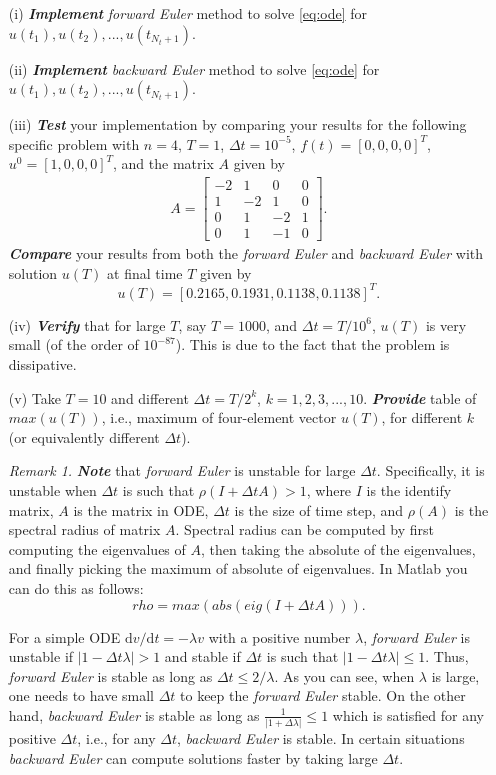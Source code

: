 \documentclass[11pt,a4paper]{article}
\newcommand{\dd}{\mathrm{d}}
\newcommand{\bfit}[1]{\textit{\textbf{#1}}}
\newcommand{\bmatx}[1]{\begin{bmatrix}
    #1
\end{bmatrix}}
\begin{document}
\begin{itemize}
\item[(i)] \bfit{Implement} {\it forward Euler} method to solve \eqref{eq:ode} for $u(t_1), u(t_2), ..., u(t_{N_t + 1})$.
\item[(ii)] \bfit{Implement} {\it backward Euler} method to solve \eqref{eq:ode} for $u(t_1), u(t_2), ..., u(t_{N_t + 1})$.
\item[(iii)] \bfit{Test} your implementation by comparing your results for the following specific problem with $n=4$, $T = 1$, $\Delta t = 10^{-5}$, $f(t) = [0, 0, 0, 0]^T$, $u^0 = [1, 0, 0, 0]^T$, and the matrix $A$ given by
\begin{align}
A = \bmatx{-2 & 1 & 0 & 0 \\ 1 & -2 & 1 & 0 \\ 0 & 1 & -2 & 1 \\ 0 & 1 & -1 & 0 }.
\end{align}
\bfit{Compare} your results from both the {\it forward Euler} and {\it backward Euler} with solution $u(T)$ at final time $T$ given by
\begin{equation}
u(T) = [0.2165, 0.1931, 0.1138, 0.1138]^T .
\end{equation}
\item[(iv)] \bfit{Verify} that for large $T$, say $T = 1000$, and $\Delta t = T/10^6$, $u(T)$ is very small (of the order of $10^{-87}$). This is due to the fact that the problem is dissipative. 
\item[(v)] Take $T = 10$ and different $\Delta t = T/2^k$, $k=1,2,3,...,10$.  \bfit{Provide} table of $max(u(T))$, i.e., maximum of four-element vector $u(T)$, for different $k$ (or equivalently different $\Delta t$). 

\noindent\textit{Remark 1.} \bfit{Note} that {\it forward Euler} is unstable for large $\Delta t$. Specifically, it is unstable when $\Delta t$ is such that $\rho(I + \Delta t A) > 1$, where $I$ is the identify matrix, $A$ is the matrix in ODE, $\Delta t$ is the size of time step, and $\rho(A)$ is the spectral radius of matrix $A$. Spectral radius can be computed by first computing the eigenvalues of $A$, then taking the absolute of the eigenvalues, and finally picking the maximum of absolute of eigenvalues. In Matlab you can do this as follows:
\begin{equation}
rho = max (abs(eig(I + \Delta t A))) .
\end{equation}

For a simple ODE $\dd v / \dd t = -\lambda v$ with a positive number $\lambda$,  {\it forward Euler} is unstable if $|1 - \Delta t \lambda | > 1$ and stable if $\Delta t$ is such that $|1 - \Delta t \lambda | \leq 1$. Thus, {\it forward Euler} is stable as long as $\Delta t \leq 2/\lambda$. As you can see, when $\lambda$ is large, one needs to have small $\Delta t$ to keep the {\it forward Euler} stable. On the other hand, {\it backward Euler} is stable as long as $\frac{1}{|1 + \Delta \lambda|} \leq 1$ which is satisfied for any positive $\Delta t$, i.e., for any $\Delta t$, {\it backward Euler} is stable. In certain situations {\it backward Euler} can compute solutions faster by taking large $\Delta t$.
\end{itemize}
\end{document}
